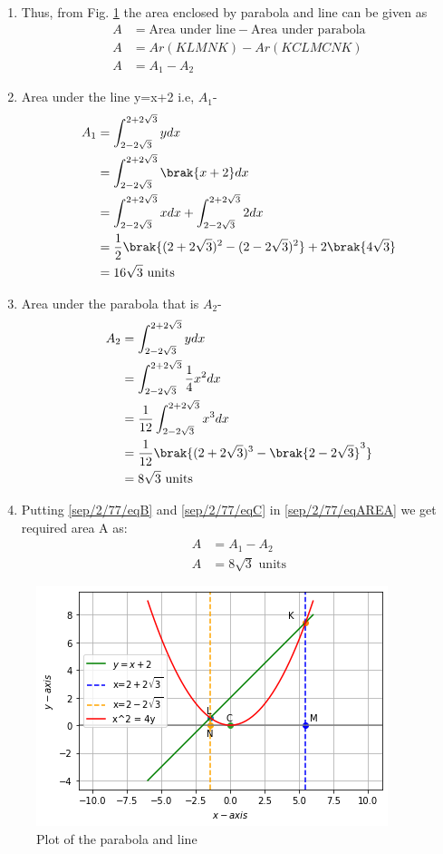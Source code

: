 \begin{enumerate}
  \item Thus, from Fig. \ref{sep/2/77/Plot of the Parabola and line} the area enclosed by parabola and line can be given as
\begin{align}
   A&= \text{Area under line} - \text{Area under parabola}
     \\
   A&= Ar(KLMNK)-Ar(KCLMCNK)
    \\
    A&= A_1 -A_2 \label{sep/2/77/eqAREA}
    \end{align}
\item Area under the line y=x+2 i.e, $A_1$-
\begin{align}
  A_1&= \int_{2-2\sqrt{3}}^{2+2\sqrt{3}} y dx
    \\
   &= \int_{2-2\sqrt{3}}^{2+2\sqrt{3}} \brak{x+2} dx\\
   &= \int_{2-2\sqrt{3}}^{2+2\sqrt{3}}x dx+\int_{2-2\sqrt{3}}^{2+2\sqrt{3}}2 dx\\
    &= \frac{1}{2}\brak{(2+2\sqrt{3})^2-(2-2\sqrt{3})^2} +2\brak{4\sqrt{3}}
    \\
    &=16\sqrt{3} \text{ units} \label{sep/2/77/eqB}
\end{align}
\item Area under the parabola that is $A_2$-
\begin{align}
    A_2&= \int_{2-2\sqrt{3}}^{2+2\sqrt{3}} y dx
    \\
    &= \int_{2-2\sqrt{3}}^{2+2\sqrt{3}} \frac{1}{4} x^2 dx
    \\
   &= \frac{1}{12} \int_{2-2\sqrt{3}}^{2+2\sqrt{3}} x^3 dx
    \\
    &= \frac{1}{12} \brak{(2+2\sqrt{3})^3-\brak{2-2\sqrt{3}}^3}
    \\
    &= 8\sqrt{3} \text{ units} \label{sep/2/77/eqC}
\end{align}
\item Putting \eqref{sep/2/77/eqB} and \eqref{sep/2/77/eqC} in \eqref{sep/2/77/eqAREA} we get required area A as:
\begin{align}
 A &= A_1 -A_2 
 \\
 A &= 8\sqrt{3} \text{ units}
\end{align}
%
\end{enumerate}
\begin{figure}[ht]
\centering
\includegraphics[width=\columnwidth]{solutions/sep/2/77/figures/parabola.png}
\caption{Plot of the parabola and line}
\label{sep/2/77/Plot of the Parabola and line}
\end{figure}

